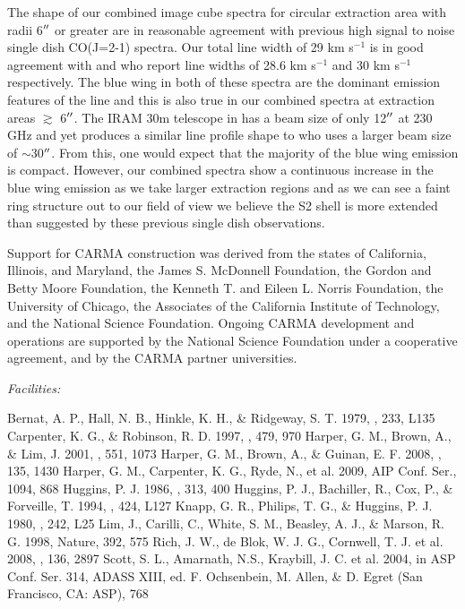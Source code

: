\documentclass[preprint2]{aastex}
\begin{document}
The shape of our combined image cube spectra for circular extraction area with radii 6$\mbox{$^{\prime\prime}$}$ or greater are in reasonable agreement with previous high signal to noise single dish CO(J=2-1) spectra. Our total line width of 29 km s${}^{-1}$ is in good agreement with \cite{hugg86} and \cite{hugg94} who report line widths of 28.6 km s${}^{-1}$ and 30 km s${}^{-1}$ respectively. The blue wing in both of these spectra are the dominant emission features of the line and this is also true in our combined spectra at extraction areas $\gtrsim$ 6$\mbox{$^{\prime\prime}$}$. The IRAM 30m telescope in \cite{hugg94} has a beam size of only 12$\mbox{$^{\prime\prime}$}$ at 230 GHz and yet produces a similar line profile shape to \cite{hugg86} who uses a larger beam size of $\sim$30$\mbox{$^{\prime\prime}$}$. From this, one would expect that the majority of the blue wing emission is compact. However, our combined spectra show a continuous increase in the blue wing emission as we take larger extraction regions and as we can see a faint ring structure out to our field of view we believe the S2 shell is more extended than suggested by these previous single dish observations.

\acknowledgments

Support for CARMA construction was derived from the states of California, Illinois, and
Maryland, the James S. McDonnell Foundation, the Gordon and Betty Moore Foundation, the
Kenneth T. and Eileen L. Norris Foundation, the University of Chicago, the Associates of the
California Institute of Technology, and the National Science Foundation. Ongoing CARMA
development and operations are supported by the National Science Foundation under a
cooperative agreement, and by the CARMA partner universities.

{\it Facilities:} 

\begin{thebibliography}{}
 Bernat, A. P., Hall, N. B., Hinkle, K. H., \& Ridgeway, S. T. 1979, \apj, 233, L135
 Carpenter, K. G., \& Robinson, R. D. 1997, \apj, 479, 970
 Harper, G. M., Brown, A., \& Lim, J. 2001, \apj, 551, 1073
 Harper, G. M., Brown, A., \& Guinan, E. F. 2008, \aj, 135, 1430
 Harper, G. M., Carpenter, K. G., Ryde, N., et al. 2009, AIP Conf. Ser., 1094, 868
 Huggins, P. J. 1986, \apj, 313, 400
 Huggins, P. J., Bachiller, R., Cox, P., \& Forveille, T. 1994, \apj, 424, L127
 Knapp, G. R., Philips, T. G., \& Huggins, P. J. 1980, \apj, 242, L25
 Lim, J., Carilli, C., White, S. M., Beasley, A. J., & Marson, R. G. 1998, Nature, 392, 575
 Rich, J. W., de Blok, W. J. G., Cornwell, T. J. et al. 2008, \aj, 136, 2897
 Scott, S. L., Amarnath, N.S., Kraybill, J. C. et al. 2004, in ASP Conf. Ser. 314, ADASS XIII, ed. F. Ochsenbein, M. Allen, & D. Egret (San Francisco, CA: ASP), 768
\end{thebibliography}
\end{document}
